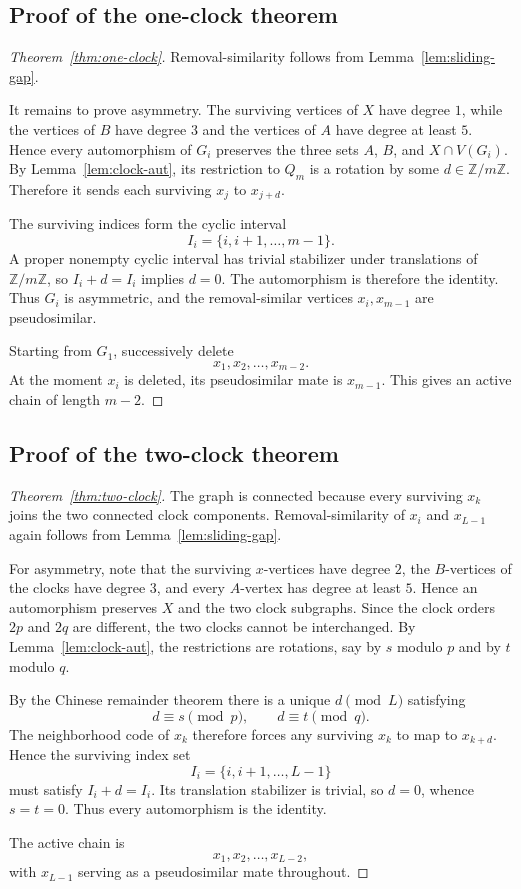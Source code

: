 \documentclass[11pt]{article}
\theoremstyle{definition}
\theoremstyle{remark}
\newcommand{\Z}{\mathbb{Z}}
\begin{document}
\subsection{Proof of the one-clock theorem}\label{app:one-clock}

\begin{proof}[Theorem~\ref{thm:one-clock}]
Removal-similarity follows from Lemma~\ref{lem:sliding-gap}.

It remains to prove asymmetry. The surviving vertices of $X$ have degree $1$, while the vertices of $B$ have degree $3$ and the vertices of $A$ have degree at least $5$. Hence every automorphism of $G_i$ preserves the three sets $A$, $B$, and $X\cap V(G_i)$. By Lemma~\ref{lem:clock-aut}, its restriction to $Q_m$ is a rotation by some $d\in\Z/m\Z$. Therefore it sends each surviving $x_j$ to $x_{j+d}$.

The surviving indices form the cyclic interval
\[
    I_i=\{i,i+1,\ldots,m-1\}.
\]
A proper nonempty cyclic interval has trivial stabilizer under translations of $\Z/m\Z$, so $I_i+d=I_i$ implies $d=0$. The automorphism is therefore the identity. Thus $G_i$ is asymmetric, and the removal-similar vertices $x_i,x_{m-1}$ are pseudosimilar.

Starting from $G_1$, successively delete
\[
    x_1,x_2,\ldots,x_{m-2}.
\]
At the moment $x_i$ is deleted, its pseudosimilar mate is $x_{m-1}$. This gives an active chain of length $m-2$.
\end{proof}

\subsection{Proof of the two-clock theorem}\label{app:two-clock}

\begin{proof}[Theorem~\ref{thm:two-clock}]
The graph is connected because every surviving $x_k$ joins the two connected clock components. Removal-similarity of $x_i$ and $x_{L-1}$ again follows from Lemma~\ref{lem:sliding-gap}.

For asymmetry, note that the surviving $x$-vertices have degree $2$, the $B$-vertices of the clocks have degree $3$, and every $A$-vertex has degree at least $5$. Hence an automorphism preserves $X$ and the two clock subgraphs. Since the clock orders $2p$ and $2q$ are different, the two clocks cannot be interchanged. By Lemma~\ref{lem:clock-aut}, the restrictions are rotations, say by $s$ modulo $p$ and by $t$ modulo $q$.

By the Chinese remainder theorem there is a unique $d\pmod{L}$ satisfying
\[
    d\equiv s\pmod p,
    \qquad
    d\equiv t\pmod q.
\]
The neighborhood code of $x_k$ therefore forces any surviving $x_k$ to map to $x_{k+d}$. Hence the surviving index set
\[
    I_i=\{i,i+1,\ldots,L-1\}
\]
must satisfy $I_i+d=I_i$. Its translation stabilizer is trivial, so $d=0$, whence $s=t=0$. Thus every automorphism is the identity.

The active chain is
\[
    x_1,x_2,\ldots,x_{L-2},
\]
with $x_{L-1}$ serving as a pseudosimilar mate throughout.
\end{proof}
\end{document}
